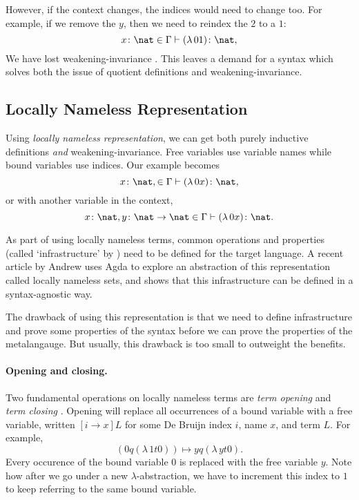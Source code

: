 However, if the context changes, the indices would need to change too. For example, if we remove the
$y$, then we need to reindex the $2$ to a $1$:
\begin{equation*}
  x \colon \nat \in \Gamma \vdash (\lambda \, 0 1) \colon \nat,
\end{equation*}
We have lost weakening-invariance \citep{aydemir_engineering_2008}. This leaves a demand for a
syntax which solves both the issue of quotient definitions and weakening-invariance.

\subsection{Locally Nameless Representation}
\label{section:background_locally_nameless}
Using \textit{locally nameless representation}, we can get both purely inductive definitions
\textit{and} weakening-invariance. Free variables use variable names while bound variables use
indices. Our example becomes
\begin{equation*}
  x \colon \nat, \in \Gamma \vdash (\lambda \, 0 x) \colon \nat,
\end{equation*}
or with another variable in the context,
\begin{equation*}
  x \colon \nat, y \colon \nat \to \nat \in \Gamma \vdash (\lambda \, 0 x) \colon \nat.
\end{equation*}

As part of using locally nameless terms, common operations and properties (called `infrastructure'
by \citet{aydemir_engineering_2008}) need to be defined for the target language. A recent article by
Andrew \citet{pitts_locally_2023} uses Agda to explore an abstraction of this representation called
locally nameless sets, and shows that this infrastructure can be defined in a syntax-agnostic way.

The drawback of using this representation is that we need to define infrastructure and prove some
properties of the syntax before we can prove the properties of the metalangauge. But usually, this
drawback is too small to outweight the benefits.

\paragraph*{Opening and closing.} Two fundamental operations on locally nameless terms are
\textit{term opening} and \textit{term closing} \citep{pitts_locally_2023}. Opening will replace all
occurrences of a bound variable with a free variable, written $[i \to x] L$ for some De Bruijn
index $i$, name $x$, and term $L$. For example,
\begin{equation*}
  [0 \to y] (0 q (\lambda \, 1 t 0)) \mapsto y q (\lambda \, y t 0).
\end{equation*}
Every occurence of the bound variable $0$ is replaced with the free variable $y$. Note how after we
go under a new $\lambda$-abstraction, we have to increment this index to $1$ to keep referring to
the same bound variable.

